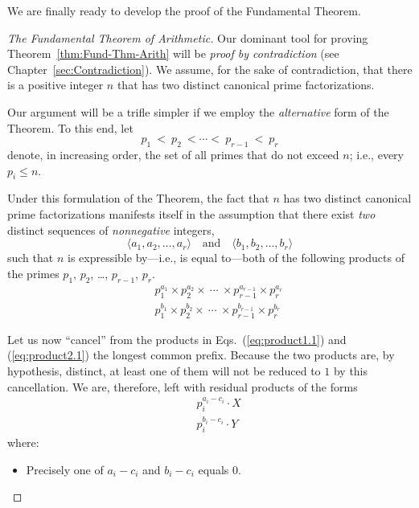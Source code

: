 We are finally ready to develop the proof of the Fundamental Theorem.

\begin{proof}[The Fundamental Theorem of Arithmetic]
Our dominant tool for proving Theorem~\ref{thm:Fund-Thm-Arith} will be {\em proof by contradiction} (see Chapter~\ref{sec:Contradiction}).  We assume, for the sake of contradiction, that there is a positive integer $n$ that has two distinct canonical prime factorizations.

Our argument will be a trifle simpler if we employ the {\em alternative} form of the Theorem.  To this end, let
\[ p_1 \ < \ p_2 \ < \cdots < \ p_{r-1} \ < \ p_r \]
denote, in increasing order, the set of all primes that do not exceed $n$; i.e., every $p_i \leq n$.

\smallskip

Under this formulation of the Theorem, the fact that $n$ has two distinct canonical prime factorizations manifests itself in the assumption that there exist {\em two} distinct sequences of {\em nonnegative} integers, 
\[ \langle a_1, a_2, \ldots, a_r \rangle \ \ \ \mbox{ and } \ \ \
\langle b_1, b_2, \ldots, b_r \rangle 
\]
such that $n$ is expressible by---i.e., is equal to---both of the following products of the primes $p_1$, $p_2$, \ldots, $p_{r-1}$, $p_r$.
\begin{eqnarray}
 & & 
\label{eq:product1.1}
p_1^{a_1} \times p_2^{a_2} \times \ \cdots \ \times p_{r-1}^{a_{r-1}} \times p_r^{a_r} \\
 & &
\label{eq:product2.1}
p_1^{b_1} \times p_2^{b_2} \times \ \cdots \ \times p_{r-1}^{b_{r-1}} \times p_r^{b_r}
\end{eqnarray}

\smallskip

Let us now ``cancel'' from the products in Eqs.~(\ref{eq:product1.1}) and (\ref{eq:product2.1}) the longest common prefix.  Because the two products are, by hypothesis, distinct, at least one of them will not be reduced to $1$ by this cancellation.  We are, therefore, left with residual products of the forms
\begin{eqnarray}
 & &
\label{eq:product1.2}
p_i^{a_i -c_i} \cdot X \\
 & &
\label{eq:product2.2}
p_i^{b_i -c_i} \cdot Y
\end{eqnarray}
where:
\begin{itemize}
\item
Precisely one of $a_i -c_i$ and $b_i -c_i$ equals $0$.

\smallskip


\end{itemize}
\end{proof}
